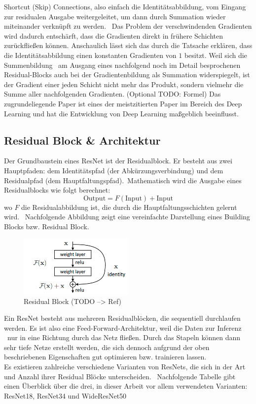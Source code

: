 \glqq Shortcut (Skip) Connections\grqq{}, also einfach die Identitätsabbildung, vom Eingang zur residualen Ausgabe weitergeleitet, um dann durch Summation wieder miteinander verknüpft zu werden. \
Das Problem der verschwindenden Gradienten wird dadurch entschärft, dass die Gradienten direkt in frühere Schichten zurückfließen können. 
Anschaulich lässt sich das durch die Tatsache erklären, dass die Identitätsabbildung einen konstanten Gradienten von $1$ besitzt. Weil sich die Summenbildung \
am Ausgang eines nachfolgend noch im Detail besprochenen Residual-Blocks auch bei der Gradientenbildung als Summation widerspiegelt, ist der Gradient einer jeden Schicht nicht mehr das Produkt, sondern vielmehr die Summe aller nachfolgenden Gradienten. (Optional TODO: Formel) 
Das zugrundeliegende Paper ist eines der meistzitierten Paper im Bereich des Deep Learning und hat die Entwicklung von Deep Learning maßgeblich beeinflusst. \
\subsection{Residual Block \& Architektur}\label{subsec:ResidualBlocks}
Der Grundbaustein eines ResNet ist der Residualblock. Er besteht aus zwei Hauptpfaden: dem Identitätspfad (der Abkürzungsverbindung) und dem Residualpfad (dem Hauptfaltungspfad).\ 
Mathematisch wird die Ausgabe eines Residualblocks wie folgt berechnet:
\[
\text{Output} = F(\text{Input}) + \text{Input}
\]
wo $F$ die Residualabbildung ist, die durch die Hauptfaltungsschichten gelernt wird.\  
Nachfolgende Abbildung zeigt eine vereinfachte Darstellung eines \glqq Building Blocks\grqq{} bzw. Residual Block. \
\begin{figure}[H]
  \centering
  \includegraphics[width=0.5\textwidth]{bilder/residual_block.png}
  \caption{Residual Block (TODO --> Ref)}
  \label{fig:ResidualBlock}
\end{figure}
Ein ResNet besteht aus mehreren Residualblöcken, die sequentiell durchlaufen werden. Es ist also eine \glqq Feed-Forward\grqq{}-Architektur, weil die Daten zur Inferenz \ 
nur in eine Richtung durch das Netz fließen. Durch das \glqq Stapeln \grqq{} können dann sehr tiefe Netze erstellt werden, die sich dennoch aufgrund der oben beschriebenen
Eigenschaften gut optimieren bzw. trainieren lassen. \\
Es existieren zahlreiche verschiedene Varianten von ResNets, die sich in der Art und Anzahl ihrer Residual Blöcke unterscheiden. \
Nachfolgende Tabelle gibt einen Überblick über die drei, in dieser Arbeit vor allem verwendeten Varianten: ResNet18, ResNet34 und WideResNet50 \

